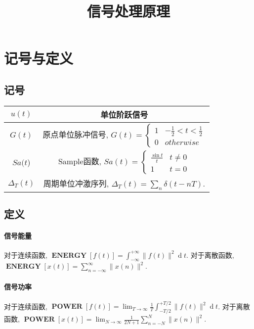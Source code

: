 \documentclass{ctexart}
\title{信号处理原理}
\DeclareMathOperator{\ENERGY}{\mathbf{ENERGY}}
\DeclareMathOperator{\POWER}{\mathbf{POWER}}
\DeclareMathOperator{\ud}{\mathrm{d}}
\begin{document}
\maketitle

\tableofcontents

\section{记号与定义}
\subsection{记号}
    \begin{table}[ht!]
        \centering
        \begin{tabular}{|c|c|}
            \hline
            $u(t)$ & 单位阶跃信号\\ \hline
            $G(t)$ & 原点单位脉冲信号, $G(t) = \begin{cases}
                1 & -\frac{1}{2} < t < \frac{1}{2}\\
                0 & otherwise \end{cases}$
                \\ \hline
            $Sa(t$) & Sample函数, $Sa(t) = \begin{cases}
                \frac{\sin t}{t} & t \neq 0 \\
                1 & t = 0 \end{cases}$ \\ \hline
            $\Delta_{T} (t)$ & 周期单位冲激序列, $\Delta_T(t) = \sum_{n} \delta(t - n T)$.\\ \hline
        \end{tabular}
    \end{table}
\subsection{定义}
\paragraph{信号能量} 对于连续函数, $\ENERGY[f(t)] = \int_{-\infty}^{+\infty} \|f(t)\|^2 \ud t$.
    对于离散函数, $\ENERGY[x(t)] = \sum_{n = -\infty}^{\infty} \|x(n)\|^2$.
\paragraph{信号功率} 对于连续函数, $\POWER[f(t)] = \lim_{T \to \infty} \frac{1}{T} \int_{-T/2}^{+T/2} \|f(t)\|^2 \ud t$.
    对于离散函数, $\POWER[x(t)] = \lim_{N \to \infty} \frac{1}{2N + 1} \sum_{n = -N}^{N} \|x(n)\|^2$.
\end{document}
